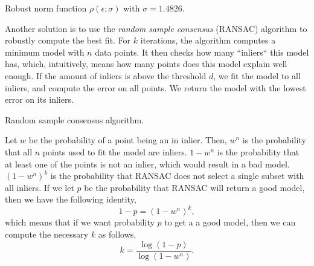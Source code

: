 \begin{marginfigure}

  \caption{Robust norm function $\rho(\epsilon;\sigma)$ with $\sigma=1.4826$.}
  \label{fig:robust-norm}
\end{marginfigure}

Another solution is to use the \textit{random sample consensus} (RANSAC)
algorithm to robustly compute the best fit. For $k$ iterations, the algorithm
computes a minimum model with $n$ data points. It then checks how many
``inliers`` this model has, which, intuitively, means how many points does this
model explain well enough. If the amount of inliers is above the threshold $d$,
we fit the model to all inliers, and compute the error on all points. We return
the model with the lowest error on its inliers.

\begin{algorithm}
  \begin{algorithmic}
      \State {$\epsilon_{\min} \gets \infty$}

         
          \EndIf
        \EndFor

          \If {$\epsilon < \epsilon_{\min}$}
          \EndIf
        \EndIf
      \End
    \EndFunction
  \end{algorithmic}
  \caption{Random sample consensus algorithm.}
\end{algorithm}

Let $w$ be the probability of a point being an in inlier. Then, $w^n$ is the
probability that all $n$ points used to fit the model are inliers. $1-w^n$ is
the probability that at least one of the points is not an inlier, which would
result in a bad model. $(1-w^n)^k$ is the probability that RANSAC does not
select a single subset with all inliers. If we let $p$ be the probability that
RANSAC will return a good model, then we have the following identity, \[
  1-p = (1-w^n)^k
,\]
which means that if we want probability $p$ to get a a good model, then we can
compute the necessary $k$ as follows, \[
  k = \frac{\log(1-p)}{\log(1-w^n)}
.\]
